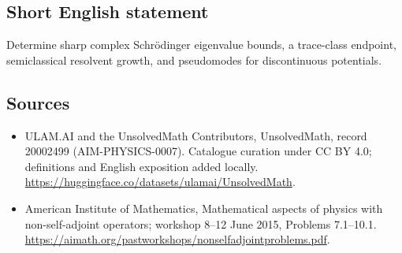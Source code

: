 \documentclass[11pt]{article}
\begin{document}
\subsection{Short English statement}
Determine sharp complex Schrödinger eigenvalue bounds, a trace-class endpoint, semiclassical resolvent growth, and pseudomodes for discontinuous potentials.
\subsection{Sources}
\begin{itemize}
\item[\hypertarget{source:20002499:1}{S1}] ULAM.AI and the UnsolvedMath Contributors, UnsolvedMath, record 20002499 (AIM-PHYSICS-0007). Catalogue curation under CC BY 4.0; definitions and English exposition added locally.
\url{https://huggingface.co/datasets/ulamai/UnsolvedMath}.
\item[\hypertarget{source:20002499:2}{S2}] American Institute of Mathematics, Mathematical aspects of physics with non-self-adjoint operators; workshop 8–12 June 2015, Problems 7.1–10.1.
\url{https://aimath.org/pastworkshops/nonselfadjointproblems.pdf}.
\end{itemize}
\label{end:20002499}
\end{document}
